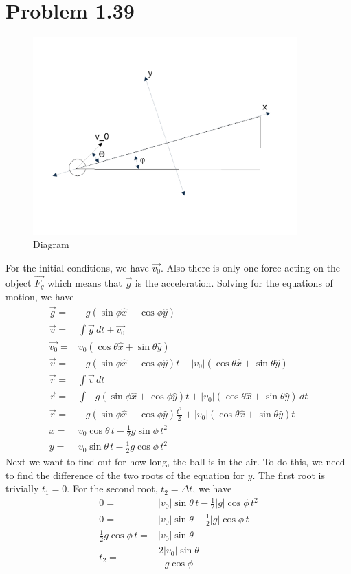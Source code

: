 \documentclass[12pt, a4paper]{article}
\begin{document}
\section*{Problem 1.39}
\begin{figure}[h]
  \includegraphics[width=4in]{fig_1.pdf}
  \caption{Diagram}
  \label{fig_1}
\end{figure}
For the initial conditions, we have $\vec{v_0}$. Also there is only one force acting on the object $\vec{F_g}$ which means that $\vec{g}$ is the acceleration. Solving for the equations of motion, we have
\begin{align*}
\vec{g} =& -g(\sin\phi \hat{x}+\cos\phi \hat{y})
\\
\vec{v} =& \int \vec{g} \,dt + \vec{v_0}
\\
\vec{v_0} =& v_0(\cos\theta\hat{x}+\sin\theta\hat{y})
\\
\vec{v} =& -g(\sin\phi \hat{x}+\cos\phi \hat{y})t + |v_0|(\cos\theta\hat{x}+\sin\theta\hat{y})
\\
\vec{r} =& \int \vec{v} \,dt
\\
\vec{r} =& \int -g(\sin\phi \hat{x}+\cos\phi \hat{y})t + |v_0|(\cos\theta\hat{x}+\sin\theta\hat{y}) \, dt
\\
\vec{r} =& -g(\sin\phi \hat{x}+\cos\phi \hat{y})\frac{t^2}{2} + |v_0|(\cos\theta\hat{x}+\sin\theta\hat{y})t
\\
x =& v_0\cos\theta \,t - \tfrac{1}{2}g\sin\phi \,t^2
\\
y =& v_0\sin\theta \,t - \tfrac{1}{2}g\cos\phi \,t^2
\end{align*}
Next we want to find out for how long, the ball is in the air. To do this, we need to find the difference of the two roots of the equation for $y$. The first root is trivially $t_1=0$. For the second root, $t_2 = \Delta t$, we have
\begin{align*}
0 =& |v_0|\sin\theta \,t - \tfrac{1}{2}|g|\cos\phi \,t^2
\\
0 =& |v_0|\sin\theta  - \tfrac{1}{2}|g|\cos\phi \,t
\\
\tfrac{1}{2}g\cos\phi \,t =& |v_0|\sin\theta
\\
t_2 =& \dfrac{2|v_0|\sin\theta}{g\cos\phi}
\end{align*}
\end{document}

